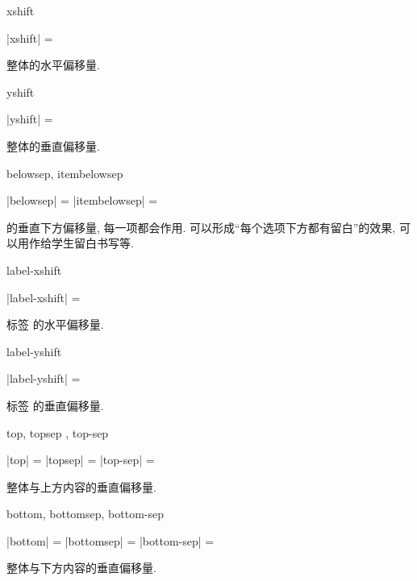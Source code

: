 \documentclass{l3doc}
\begin{document}
\begin{documentation}
\begin{function}{xshift}
  \begin{syntax}
    |xshift| = 
  \end{syntax}
  整体的水平偏移量.
\end{function}

\begin{function}[updated = 2021-12-25]{yshift}
  \begin{syntax}
    |yshift| = 
  \end{syntax}
  整体的垂直偏移量.
\end{function}

\begin{function}[added = 2021-12-25]{belowsep, itembelowsep}
  \begin{syntax}
    |belowsep| = 
    |itembelowsep| = 
  \end{syntax}
   的垂直下方偏移量, 每一项都会作用. 可以形成“每个选项下方都有留白”的效果, 可以用作给学生留白书写等.
\end{function}

\begin{function}{label-xshift}
  \begin{syntax}
    |label-xshift| = 
  \end{syntax}
  标签  的水平偏移量.
\end{function}

\begin{function}{label-yshift}
  \begin{syntax}
    |label-yshift| = 
  \end{syntax}
  标签  的垂直偏移量.
\end{function}

\begin{function}{top, topsep , top-sep}
  \begin{syntax}
    |top| = 
    |topsep| = 
    |top-sep| = 
  \end{syntax}
  整体与上方内容的垂直偏移量.
\end{function}


\begin{function}{bottom, bottomsep, bottom-sep}
  \begin{syntax}
    |bottom| = 
    |bottomsep| = 
    |bottom-sep| = 
  \end{syntax}
  整体与下方内容的垂直偏移量.
\end{function}



\end{documentation}
\end{document}
